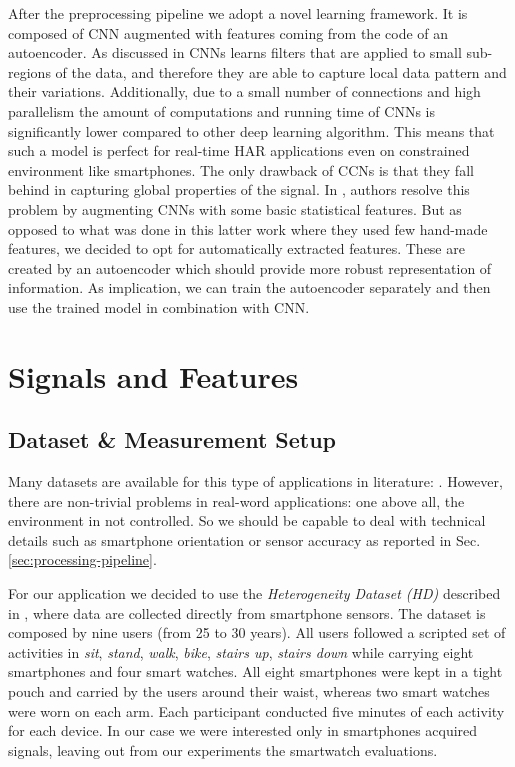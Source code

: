 After the preprocessing pipeline we adopt a novel learning framework. It is composed of CNN augmented with features coming from the code of an autoencoder. As discussed in \cite{ignatov2018real} CNNs learns filters that are applied to small sub-regions of the data, and therefore they are able to capture local data pattern and their variations. Additionally, due to a small number of connections and high parallelism the amount of computations and running time of CNNs is significantly lower compared to other deep learning algorithm. This means that such a model is perfect for real-time HAR applications even on constrained environment like smartphones. The only drawback of CCNs is that they fall behind in capturing global properties of the signal. In \cite{ignatov2018real}, authors resolve this problem by augmenting CNNs with some basic statistical features. But as opposed to what was done in this latter work where they used few hand-made features, we decided to opt for automatically extracted features. These are created by an autoencoder which should provide more robust representation of information. As implication, we can train the autoencoder separately and then use the trained model in combination with CNN.

\section{Signals and Features}
\label{sec:signals-and-features}

\subsection{Dataset \& Measurement Setup}
\label{subsec:dataset-measurement-setup}

Many datasets are available for this type of applications in
literature: \cite{HETEROGENEITY, UCI, WISDM, EXTRASENSORY}.  However,
there are non-trivial problems in real-word applications: one above
all, the environment in not controlled. So we should be capable to
deal with technical details such as smartphone orientation or sensor
accuracy as reported in Sec. \ref{sec:processing-pipeline}.

For our application we decided to use the \textit{Heterogeneity
  Dataset (HD)} \cite{HETEROGENEITY} described in
\cite{stisen2015smart}, where data are collected directly from
smartphone sensors. The dataset is composed by nine users (from 25 to
30 years). All users followed a scripted set of activities in
\textit{sit}, \textit{stand}, \textit{walk}, \textit{bike},
\textit{stairs up}, \textit{stairs down} while carrying eight
smartphones and four smart watches. All eight smartphones were kept in
a tight pouch and carried by the users around their waist, whereas two
smart watches were worn on each arm. Each participant conducted five
minutes of each activity for each device. In our case we were
interested only in smartphones acquired signals, leaving out from our
experiments the smartwatch evaluations.


